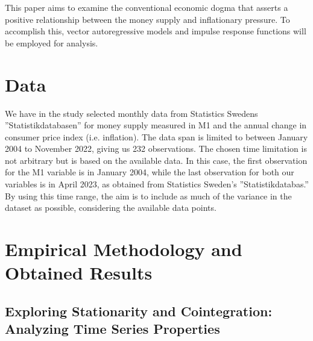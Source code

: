 \documentclass{article}
\begin{document}
    This paper aims to examine the conventional economic dogma that asserts a positive relationship
    between the money supply and inflationary pressure. To accomplish this, vector autoregressive
    models and impulse response functions will be employed for analysis.

    \newpage

    \vspace*{1cm}
    \section*{Data}
    We have in the study selected monthly data from Statistics Swedens ”Statistikdatabasen” for money
    supply measured in M1 and the annual change in consumer price index (i.e. inflation). The data
    span is limited to between January 2004 to November 2022, giving us 232 observations. The chosen
    time limitation is not arbitrary but is based on the available data. In this case, the first
    observation for the M1 variable is in January 2004, while the last observation for both our variables
    is in April 2023, as obtained from Statistics Sweden’s ”Statistikdatabas.” By using this time range,
    the aim is to include as much of the variance in the dataset as possible, considering the available
    data points.

    \section*{Empirical Methodology and Obtained Results}
    
    \subsection*{Exploring Stationarity and Cointegration: Analyzing Time Series Properties}
\end{document}
